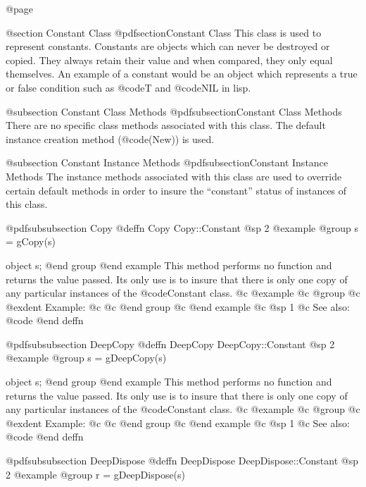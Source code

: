 @page

@section Constant Class
@pdfsection{Constant Class}
This class is used to represent constants.  Constants are objects which
can never be destroyed or copied.  They always retain their value and
when compared, they only equal themselves.  An example of a constant
would be an object which represents a true or false condition such
as @code{T} and @code{NIL} in lisp.

@subsection Constant Class Methods
@pdfsubsection{Constant Class Methods}
There are no specific class methods associated with this class.  The
default instance creation method (@code(New)) is used.


@subsection Constant Instance Methods
@pdfsubsection{Constant Instance Methods}
The instance methods associated with this class are used to override
certain default methods in order to insure the ``constant'' status
of instances of this class.











@pdfsubsubsection {Copy}
@deffn {Copy} Copy::Constant
@sp 2
@example
@group
s = gCopy(s)

object  s;
@end group
@end example
This method performs no function and returns the value passed.  Its only
use is to insure that there is only one copy of any particular instances
of the @code{Constant} class.
@c @example
@c @group
@c @exdent Example:
@c 
@c @end group
@c @end example
@c @sp 1
@c See also:  @code{}
@end deffn












@pdfsubsubsection {DeepCopy}
@deffn {DeepCopy} DeepCopy::Constant
@sp 2
@example
@group
s = gDeepCopy(s)

object  s;
@end group
@end example
This method performs no function and returns the value passed.  Its only
use is to insure that there is only one copy of any particular instances
of the @code{Constant} class.
@c @example
@c @group
@c @exdent Example:
@c 
@c @end group
@c @end example
@c @sp 1
@c See also:  @code{}
@end deffn







@pdfsubsubsection {DeepDispose}
@deffn {DeepDispose} DeepDispose::Constant
@sp 2
@example
@group
r = gDeepDispose(s)

